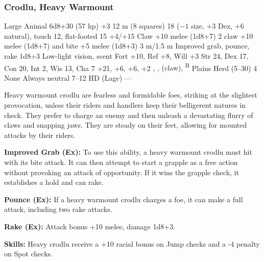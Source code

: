 \subsubsection{Crodlu, Heavy Warmount}
\begin{MonsterStats}
{Large Animal}
{6d8+30 (57 hp)}
{+3}
{12 m (8 squares)}
{18 ($-1$ size, +3 Dex, +6 natural), touch 12, flat-footed 15}
{+4/+15}
{Claw +10 melee (1d8+7)}
{2 claw +10 melee (1d8+7) and bite +5 melee (1d8+3)}
{3 m/1.5 m}
{Improved grab, pounce, rake 1d8+3}
{Low-light vision, scent}
{Fort +10, Ref +8, Will +3}
{Str 24, Dex 17, Con 20, Int 2, Wis 13, Cha 7}
{ +21,  +6,  +6,  +2}
{, ,  (claw), \textsuperscript{B}}
{Plains}
{Herd (5--30)}
{4}
{None}
{Always neutral}
{7--12 HD (Lage)}
{---}
\end{MonsterStats}


Heavy warmount crodlu are fearless and formidable foes, striking at the slightest provocation, unless their riders and handlers keep their belligerent natures in check. They prefer to charge an enemy and then unleash a devastating flurry of claws and snapping jaws. They are steady on their feet, allowing for mounted attacks by their riders.

\textbf{Improved Grab (Ex):} To use this ability, a heavy warmount crodlu must hit with its bite attack. It can then attempt to start a grapple as a free action without provoking an attack of opportunity. If it wins the grapple check, it establishes a hold and can rake.

\textbf{Pounce (Ex):} If a heavy warmount crodlu charges a foe, it can make a full attack, including two rake attacks.

\textbf{Rake (Ex):} Attack bonus +10 melee, damage 1d8+3.

\textbf{Skills:} Heavy crodlu receive a +10 racial bonus on Jump checks and a -4 penalty on Spot checks.
